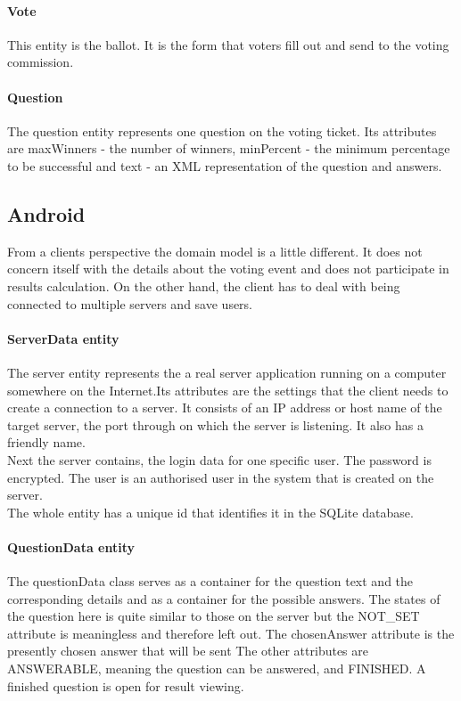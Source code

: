 \documentclass[11pt,twoside,a4paper]{book}
\begin{document}
\paragraph{Vote}
This entity is the ballot. It is the form that voters fill out and send to the voting commission.
\paragraph{Question}
The question entity represents one question on the voting ticket. Its attributes are maxWinners - the number of winners, minPercent - the minimum percentage to be successful and text - an XML representation of the question and answers. 
\subsection{Android}
From a clients perspective the domain model is a little different. It does not concern itself with the details about the voting event and does not participate in results calculation. On the other hand, the client has to deal with being connected to multiple servers and save users.
\paragraph{ServerData entity}
The server entity represents the a real server application running on a computer somewhere on the Internet.Its attributes are the settings that the client needs to create a connection to a server. It consists of an IP address or host name of the target server, the port through on which the server is listening. It also has a friendly name.\\
Next the server contains, the login data for one specific user. The password is encrypted. The user is  an authorised user in the system that is created on the server. \\
The whole entity has a unique id that identifies it in the SQLite database.
\paragraph{QuestionData entity}
The questionData class serves as a container for the question text and the corresponding details and as a container for the possible answers. The states of the question here is quite similar to those on the server but the NOT\_SET attribute is meaningless and therefore left out. The chosenAnswer attribute is the presently chosen answer that will be sent The other attributes are ANSWERABLE, meaning the question can be answered, and FINISHED. A finished question is open for result viewing. 
\end{document}

